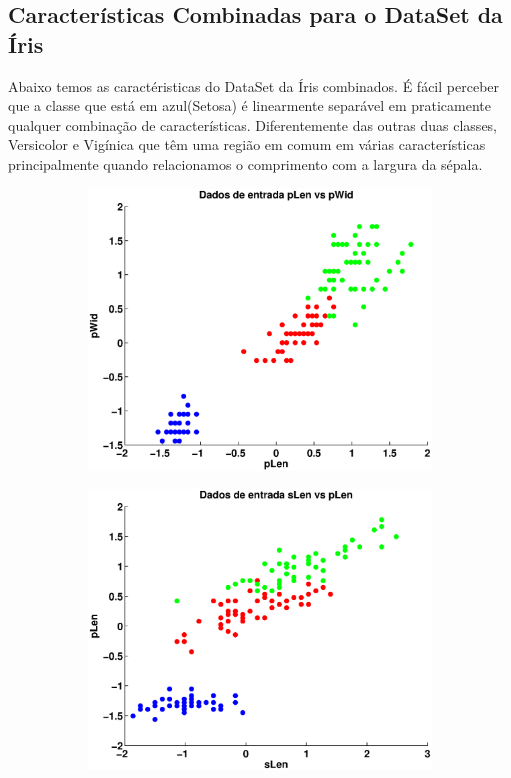 \documentclass[12pt,journal,onecolumn]{IEEEtran}
\begin{document}
\subsection{Características Combinadas para o DataSet da Íris}
\label{subsec:IrisDataset}

Abaixo temos as caractéristicas do DataSet da Íris combinados. É fácil perceber
que a classe que está em azul(Setosa) é linearmente separável em praticamente
qualquer combinação de características. Diferentemente das outras duas classes,
Versicolor e Vigínica que têm uma região em comum em várias características
principalmente quando relacionamos o comprimento com a largura da sépala.

\begin{figure}[h]
	\centering
	\begin{subfigure}[h]{0.3\textwidth}
		\includegraphics[width=\textwidth]{eps/3classes/input/pLen-vs-pWid.eps}
	\end{subfigure} 
	\begin{subfigure}[h]{0.3\textwidth}
		\includegraphics[width=\textwidth]{eps/3classes/input/sLen-vs-pLen.eps}

\end{subfigure}
\end{figure}
\end{document}

